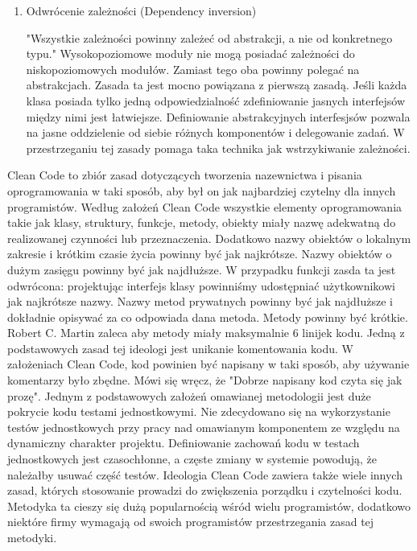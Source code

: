 \documentclass[oneside, eng]{mgr}
\begin{document}
\begin{enumerate}
\item Odwrócenie zależności (Dependency inversion)

"Wszystkie zależności powinny zależeć od abstrakcji, a nie od konkretnego typu." Wysokopoziomowe moduły nie mogą posiadać zależności do niskopoziomowych modułów. Zamiast tego oba powinny polegać na abstrakcjach. Zasada ta jest mocno powiązana z pierwszą zasadą. Jeśli każda klasa posiada tylko jedną odpowiedzialność zdefiniowanie jasnych interfejsów między nimi jest łatwiejsze. Definiowanie abstrakcyjnych interfesjsów pozwala na jasne oddzielenie od siebie różnych komponentów i delegowanie zadań. W przestrzeganiu tej zasady pomaga taka technika jak wstrzykiwanie zależności.

\end{enumerate}

Clean Code to zbiór zasad dotyczących tworzenia nazewnictwa i pisania oprogramowania w taki sposób, aby był on jak najbardziej czytelny dla innych programistów. Według założeń Clean Code wszystkie elementy oprogramowania takie jak klasy, struktury, funkcje, metody, obiekty miały nazwę adekwatną do realizowanej czynności lub przeznaczenia. Dodatkowo nazwy obiektów o lokalnym zakresie i krótkim czasie życia powinny być jak najkrótsze. Nazwy obiektów o dużym zasięgu powinny być jak najdłuższe. W przypadku funkcji zasda ta jest odwrócona: projektując interfejs klasy powinniśmy udostępniać użytkownikowi jak najkrótsze nazwy. Nazwy metod prywatnych powinny być jak najdłuższe i dokładnie opisywać za co odpowiada dana metoda. Metody powinny być krótkie. Robert C. Martin zaleca aby metody miały maksymalnie 6 linijek kodu. Jedną z podstawowych zasad tej ideologi jest unikanie komentowania kodu. W założeniach Clean Code, kod powinien być napisany w taki sposób, aby używanie komentarzy było zbędne. Mówi się wręcz, że "Dobrze napisany kod czyta się jak prozę". Jednym z podstawowych założeń omawianej metodologii jest duże pokrycie kodu testami jednostkowymi. Nie zdecydowano się na wykorzystanie testów jednostkowych przy pracy nad omawianym komponentem ze względu na dynamiczny charakter projektu. Definiowanie zachowań kodu w testach jednostkowych jest czasochłonne, a częste zmiany w systemie powodują, że należałby usuwać część testów.  Ideologia Clean Code zawiera także wiele innych zasad, których stosowanie prowadzi do zwiększenia porządku i czytelności kodu. Metodyka ta cieszy się dużą popularnością wśród wielu programistów, dodatkowo niektóre firmy wymagają od swoich programistów przestrzegania zasad tej metodyki.
\end{document}
